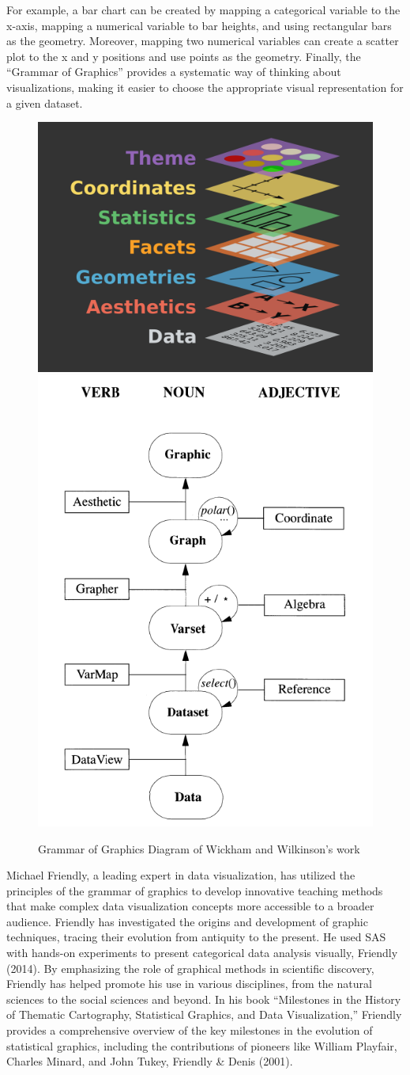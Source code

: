 \documentclass[print]{nuthesis}
\begin{document}
For example, a bar chart can be created by mapping a categorical variable to the x-axis, mapping a numerical variable to bar heights, and using rectangular bars as the geometry.
Moreover, mapping two numerical variables can create a scatter plot to the x and y positions and use points as the geometry.
Finally, the ``Grammar of Graphics'' provides a systematic way of thinking about visualizations, making it easier to choose the appropriate visual representation for a given dataset.

\begin{figure}

{\centering \includegraphics[width=0.45\linewidth]{figure/gglayers} \includegraphics[width=0.45\linewidth]{figure/graphic-flowchart} 

}

\caption{Grammar of Graphics Diagram of Wickham and Wilkinson's work}\label{fig:graphics2}
\end{figure}

Michael Friendly, a leading expert in data visualization, has utilized the principles of the grammar of graphics to develop innovative teaching methods that make complex data visualization concepts more accessible to a broader audience.
Friendly has investigated the origins and development of graphic techniques, tracing their evolution from antiquity to the present.
He used SAS with hands-on experiments to present categorical data analysis visually, Friendly (2014).
By emphasizing the role of graphical methods in scientific discovery, Friendly has helped promote his use in various disciplines, from the natural sciences to the social sciences and beyond.
In his book ``Milestones in the History of Thematic Cartography, Statistical Graphics, and Data Visualization,'' Friendly provides a comprehensive overview of the key milestones in the evolution of statistical graphics, including the contributions of pioneers like William Playfair, Charles Minard, and John Tukey, Friendly \& Denis (2001).
\end{document}
